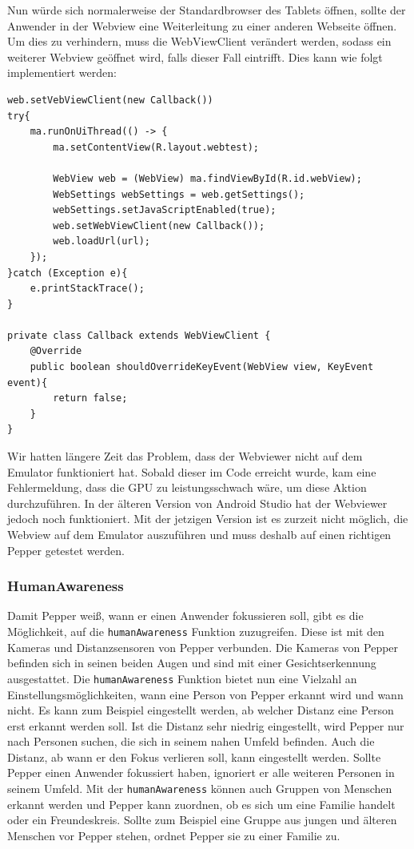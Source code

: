 Nun würde sich normalerweise der Standardbrowser des Tablets öffnen, sollte der Anwender in der Webview eine Weiterleitung zu einer anderen Webseite 
öffnen. Um dies zu verhindern, muss die WebViewClient verändert werden, sodass ein weiterer Webview geöffnet wird, falls dieser Fall eintrifft. 
Dies kann wie folgt implementiert werden: \\

\begin{lstlisting}
web.setVebViewClient(new Callback())
try{
    ma.runOnUiThread(() -> {
        ma.setContentView(R.layout.webtest);

        WebView web = (WebView) ma.findViewById(R.id.webView);
        WebSettings webSettings = web.getSettings();
        webSettings.setJavaScriptEnabled(true);
        web.setWebViewClient(new Callback());
        web.loadUrl(url);
    });
}catch (Exception e){
    e.printStackTrace();
}

private class Callback extends WebViewClient {
    @Override
    public boolean shouldOverrideKeyEvent(WebView view, KeyEvent event){
        return false;
    }
}
\end{lstlisting}
Wir hatten längere Zeit das Problem, dass der Webviewer nicht auf dem Emulator funktioniert hat. Sobald dieser im Code erreicht wurde, kam eine 
Fehlermeldung, dass die GPU zu leistungsschwach wäre, um diese Aktion durchzuführen. In der älteren Version von Android Studio hat der Webviewer 
jedoch noch funktioniert. 
Mit der jetzigen Version ist es zurzeit nicht möglich, die Webview auf dem Emulator auszuführen und muss deshalb auf einen richtigen Pepper 
getestet werden.\\

\subsubsection{HumanAwareness}

Damit Pepper weiß, wann er einen Anwender fokussieren soll, gibt es die Möglichkeit, auf die \verb|humanAwareness| Funktion zuzugreifen. 
Diese ist mit den Kameras und Distanzsensoren von Pepper verbunden. Die Kameras von Pepper befinden sich in seinen beiden Augen und sind mit 
einer Gesichtserkennung ausgestattet. Die \verb|humanAwareness| Funktion bietet nun eine Vielzahl an Einstellungsmöglichkeiten, wann eine 
Person von Pepper erkannt wird und wann nicht. Es kann zum Beispiel eingestellt werden, ab welcher Distanz eine Person erst erkannt werden soll. 
Ist die Distanz sehr niedrig eingestellt, wird Pepper nur nach Personen suchen, die sich in seinem nahen Umfeld befinden. Auch die Distanz, 
ab wann er den Fokus verlieren soll, kann eingestellt werden. 
Sollte Pepper einen Anwender fokussiert haben, ignoriert er alle weiteren Personen in seinem Umfeld. Mit der \verb|humanAwareness| können auch 
Gruppen von Menschen erkannt werden und Pepper kann zuordnen, ob es sich um eine Familie handelt oder ein Freundeskreis. Sollte zum Beispiel eine 
Gruppe aus jungen und älteren Menschen vor Pepper stehen, ordnet Pepper sie zu einer Familie zu.\\

